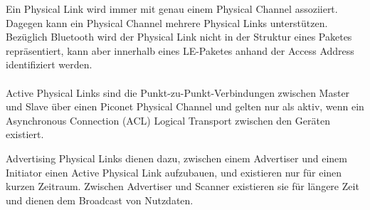 Ein Physical Link wird immer mit genau einem Physical Channel assoziiert. Dagegen kann ein Physical Channel mehrere Physical Links unterstützen. Bezüglich Bluetooth wird der Physical Link nicht in der Struktur eines Paketes repräsentiert, kann aber innerhalb eines LE-Paketes anhand der Access Address identifiziert werden. \cite{BtSpec4.0_164}
\\\\
Active Physical Links sind die Punkt-zu-Punkt-Verbindungen zwischen Master und Slave über einen Piconet Physical Channel und gelten nur als aktiv, wenn ein Asynchronous Connection (ACL) Logical Transport zwischen den Geräten existiert. \cite{BtSpec4.0_166-167}

Advertising Physical Links dienen dazu, zwischen einem Advertiser und einem Initiator einen Active Physical Link aufzubauen, und existieren nur für einen kurzen Zeitraum. Zwischen Advertiser und Scanner existieren sie für längere Zeit und dienen dem Broadcast von Nutzdaten. \cite{BtSpec4.0_166-167}